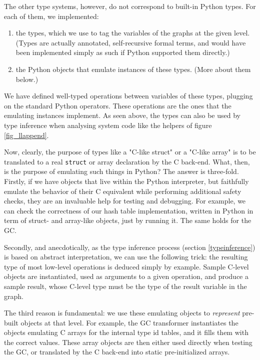 \documentclass{acm_proc_article-sp}
\begin{document}
The other type systems, however, do not correspond to built-in Python
types.  For each of them, we implemented:
%
\begin{enumerate}
\item the types, which we use to tag the variables of the graphs at
      the given level.  (Types are actually annotated, self-recursive
      formal terms, and would have been implemented simply as such if
      Python supported them directly.)

\item the Python objects that emulate instances of these types.  (More
      about them below.)
\end{enumerate}
%
We have defined well-typed operations between variables of these types,
plugging on the standard Python operators.  These operations are the
ones that the emulating instances implement.  As seen above, the types
can also be used by type inference when analysing system code like the
helpers of figure \ref{fig_llappend}.

Now, clearly, the purpose of types like a "C-like struct" or a "C-like
array" is to be translated to a real \texttt{struct} or array declaration by
the C back-end.  What, then, is the purpose of emulating such things in
Python?  The answer is three-fold.  Firstly, if we have objects that
live within the Python interpreter, but faithfully emulate the behavior
of their C equivalent while performing additional safety checks, they
are an invaluable help for testing and debugging.  For example, we can
check the correctness of our hash table implementation, written in
Python in term of struct- and array-like objects, just by running it.
The same holds for the GC.

Secondly, and anecdotically, as the type inference process (section
\ref{typeinference}) is based on abstract interpretation, we can use
the following trick: the resulting type of most low-level operations
is deduced simply by example.  Sample C-level objects are
instantiated, used as arguments to a given operation, and produce a
sample result, whose C-level type must be the type of the result
variable in the graph.

The third reason is fundamental: we use these emulating objects to
\textit{represent} pre-built objects at that level.  For example, the GC
transformer instantiates the objects emulating C arrays for the internal
type id tables, and it fills them with the correct values.  These array
objects are then either used directly when testing the GC, or translated
by the C back-end into static pre-initialized arrays.
\end{document}
